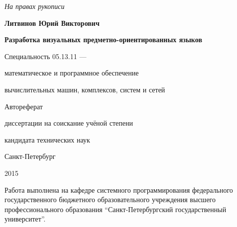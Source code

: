\newcommand{\sfs}{\fontsize{12pt}{12pt}\selectfont}
\sfs %
\thispagestyle{empty}

\vspace{10mm}
\begin{flushright}
  \Large\textit{На правах рукописи}
\end{flushright}

\vspace{25mm}
\begin{center}
  \Large\bf{Литвинов Юрий Викторович}
\end{center}

\vspace{20mm}
\begin{center}
  {\bf \LARGE Разработка визуальных предметно-ориентированных языков
\par}

\vspace{20mm}
{\Large
Специальность 05.13.11 ---\par
математическое и программное обеспечение\par
вычислительных машин, комплексов, систем и сетей
}

\vspace{15mm}
\LARGE Автореферат\par
\Large{диссертации на соискание учёной степени\par
кандидата технических наук}
\end{center}

\vspace{35mm}
\begin{center}
  \Large{Санкт-Петербург\par 2015}
\end{center}

\newpage
\thispagestyle{empty}

\small{
\noindent Работа выполнена на кафедре системного программирования федерального государственного
бюджетного образовательного учреждения высшего профессионального образования "`Санкт-Петербургский
государственный университет"'.
}

